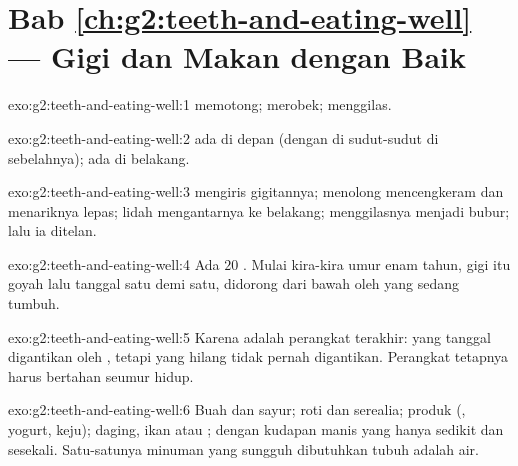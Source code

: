 \section*{Bab \ref{ch:g2:teeth-and-eating-well} --- Gigi dan Makan dengan Baik}

\begin{solution}{exo:g2:teeth-and-eating-well:1}
 memotong;  merobek;  menggilas.
\end{solution}

\begin{solution}{exo:g2:teeth-and-eating-well:2}
 ada di depan (dengan  di sudut-sudut di
sebelahnya);  ada di belakang.
\end{solution}

\begin{solution}{exo:g2:teeth-and-eating-well:3}
 mengiris gigitannya;  menolong mencengkeram dan
menariknya lepas; lidah mengantarnya ke belakang; 
menggilasnya menjadi bubur; lalu ia ditelan.
\end{solution}

\begin{solution}{exo:g2:teeth-and-eating-well:4}
Ada $20$ . Mulai kira-kira umur enam tahun, gigi itu goyah
lalu tanggal satu demi satu, didorong dari bawah oleh  yang
sedang tumbuh.
\end{solution}

\begin{solution}{exo:g2:teeth-and-eating-well:5}
Karena  adalah perangkat terakhir:  yang tanggal
digantikan oleh , tetapi  yang hilang tidak pernah
digantikan. Perangkat tetapnya harus bertahan seumur hidup.
\end{solution}

\begin{solution}{exo:g2:teeth-and-eating-well:6}
Buah dan sayur; roti dan serealia; produk  (, yogurt, keju);
daging, ikan atau ; dengan kudapan manis yang hanya sedikit dan
sesekali. Satu-satunya minuman yang sungguh dibutuhkan tubuh adalah
air.
\end{solution}


